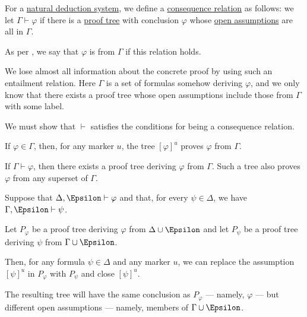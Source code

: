 \begin{definition}\label{def:natural_deduction_entailment}
  For a \hyperref[def:abstract_natural_deduction_system]{natural deduction system}, we define a \hyperref[def:consequence_relation]{consequence relation} as follows: we let \( \Gamma \vdash \varphi \) if there is a \hyperref[def:natural_deduction_proof_tree]{proof tree} with conclusion \( \varphi \) whose \hyperref[def:natural_deduction_proof_tree/open]{open assumptions} are all in \( \Gamma \).

  As per , we say that \( \varphi \) is  from \( \Gamma \) if this relation holds.
\end{definition}
\begin{comments}
  \item We lose almost all information about the concrete proof by using such an entailment relation. Here \( \Gamma \) is a set of formulas somehow deriving \( \varphi \), and we only know that there exists a proof tree whose open assumptions include those from \( \Gamma \) with some label.
\end{comments}
\begin{defproof}
  We must show that \( {\vdash} \) satisfies the conditions for being a consequence relation.

   If \( \varphi \in \Gamma \), then, for any marker \( u \), the tree \( [\varphi]^u \) proves \( \varphi \) from \( \Gamma \).

   If \( \Gamma \vdash \varphi \), then there exists a proof tree deriving \( \varphi \) from \( \Gamma \). Such a tree also proves \( \varphi \) from any superset of \( \Gamma \).

   Suppose that \( \Delta, \Epsilon \vdash \varphi \) and that, for every \( \psi \in \Delta \), we have \( \Gamma, \Epsilon \vdash \psi \).

  Let \( P_\varphi \) be a proof tree deriving \( \varphi \) from \( \Delta \cup \Epsilon \) and let \( P_\psi \) be a proof tree deriving \( \psi \) from \( \Gamma \cup \Epsilon \).

  Then, for any formula \( \psi \in \Delta \) and any marker \( u \), we can replace the assumption \( [\psi]^u \) in \( P_\varphi \) with \( P_\psi \) and close \( [\psi]^u \).

  The resulting tree will have the same conclusion as \( P_\varphi \) --- namely, \( \varphi \) --- but different open assumptions --- namely, members of \( \Gamma \cup \Epsilon \).
\end{defproof}

